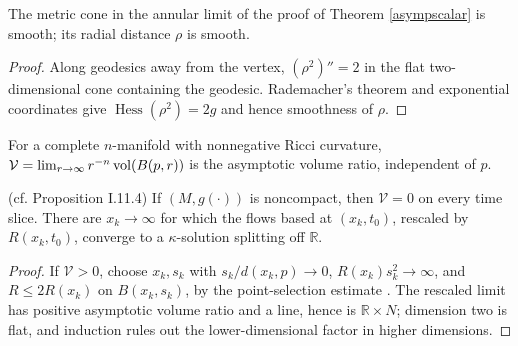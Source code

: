 \begin{lemma}
\label{lem:kl-asymptotic-scalar-curvature-asymptotic-volume-ratio-scalar-curvature-lemma}

The metric cone in the annular limit of the proof of
Theorem \ref{asympscalar} is smooth; its radial distance $\rho$ is smooth.
\end{lemma}
\begin{proof}
\sketch Along geodesics away from the vertex, $(\rho^2)''=2$ in the flat
two-dimensional cone containing the geodesic.  Rademacher's theorem and
exponential coordinates give $\operatorname{Hess}(\rho^2)=2g$ and hence
smoothness of $\rho$.
\end{proof}
\begin{definition}
\label{def:kl-asymptotic-scalar-curvature-asymptotic-volume-ratio-asymptotic-volume-ratio-definition}

For a complete $n$-manifold with nonnegative Ricci curvature,
$\mathcal V=\lim_{r\to\infty}r^{-n}\operatorname{vol}(B(p,r))$ is the asymptotic volume
ratio, independent of $p$.
\end{definition}
\begin{proposition}
\label{prop:kl-asymptotic-scalar-curvature-asymptotic-volume-ratio-existence-kappa-solutions}

(cf. Proposition I.11.4) \label{propI.11.4}
If $(M,g(\cdot))$ is noncompact, then $\mathcal V=0$ on every time slice.
There are $x_k\to\infty$ for which the flows based at $(x_k,t_0)$, rescaled
by $R(x_k,t_0)$, converge to a $\kappa$-solution splitting off $\mathbb R$.
\end{proposition}
\begin{proof}
\sketch If $\mathcal V>0$, choose $x_k,s_k$ with
$s_k/d(x_k,p)\to0$, $R(x_k)s_k^2\to\infty$, and $R\leq2R(x_k)$ on
$B(x_k,s_k)$, by the point-selection estimate \cite[Lemma 22.2]{Hamilton}.
The rescaled limit has positive asymptotic volume ratio and
a line, hence is $\mathbb R\times N$; dimension two is flat, and induction
rules out the lower-dimensional factor in higher dimensions.
\end{proof}

